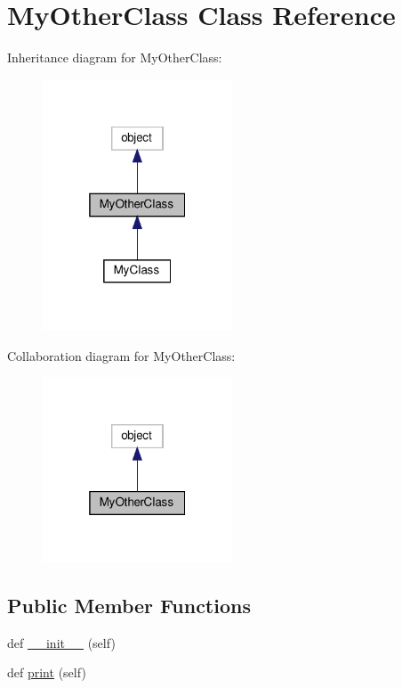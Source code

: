 \hypertarget{classsrc_1_1my__other__class_1_1MyOtherClass}{}\section{My\+Other\+Class Class Reference}
\label{classsrc_1_1my__other__class_1_1MyOtherClass}


Inheritance diagram for My\+Other\+Class\+:\nopagebreak
\begin{figure}[H]
\begin{center}
\leavevmode
\includegraphics[width=160pt]{classsrc_1_1my__other__class_1_1MyOtherClass__inherit__graph}
\end{center}
\end{figure}


Collaboration diagram for My\+Other\+Class\+:\nopagebreak
\begin{figure}[H]
\begin{center}
\leavevmode
\includegraphics[width=160pt]{classsrc_1_1my__other__class_1_1MyOtherClass__coll__graph}
\end{center}
\end{figure}
\subsection*{Public Member Functions}
\begin{DoxyCompactItemize}
\item 
def \hyperlink{classsrc_1_1my__other__class_1_1MyOtherClass_ae64f0875afe3067b97ba370b354b9213}{\+\_\+\+\_\+init\+\_\+\+\_\+} (self)
\item 
def \hyperlink{classsrc_1_1my__other__class_1_1MyOtherClass_a711fec1561ace90a200ff0eaafeaee49}{print} (self)
\end{DoxyCompactItemize}
